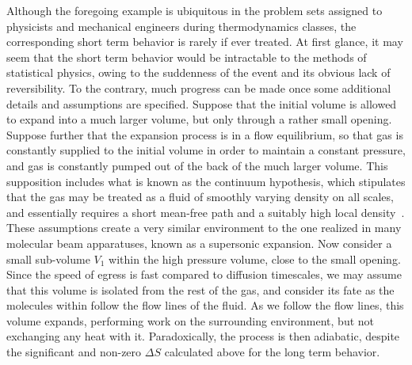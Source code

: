 Although the foregoing example is ubiquitous in the problem sets assigned to physicists and mechanical engineers during thermodynamics classes, the corresponding short term behavior is rarely if ever treated.
At first glance, it may seem that the short term behavior would be intractable to the methods of statistical physics, owing to the suddenness of the event and its obvious lack of reversibility.
To the contrary, much progress can be made once some additional details and assumptions are specified.
Suppose that the initial volume is allowed to expand into a much larger volume, but only through a rather small opening.
Suppose further that the expansion process is in a flow equilibrium, so that gas is constantly supplied to the initial volume in order to maintain a constant pressure, and gas is constantly pumped out of the back of the much larger volume.
This supposition includes what is known as the continuum hypothesis, which stipulates that the gas may be treated as a fluid of smoothly varying density on all scales, and essentially requires a short mean-free path and a suitably high local density~\citep[Sec.~1.2]{Batchelor1967}.
These assumptions create a very similar environment to the one realized in many molecular beam apparatuses, known as a supersonic expansion.
Now consider a small sub-volume $V_1$ within the high pressure volume, close to the small opening.
Since the speed of egress is fast compared to diffusion timescales, we may assume that this volume is isolated from the rest of the gas, and consider its fate as the molecules within follow the flow lines of the fluid.
As we follow the flow lines, this volume expands, performing work on the surrounding environment, but not exchanging any heat with it.
Paradoxically, the process is then adiabatic, despite the significant and non-zero $\Delta S$ calculated above for the long term behavior.


